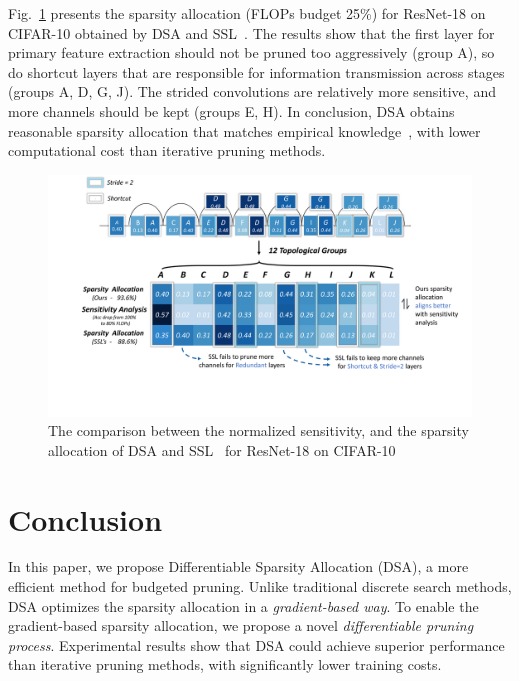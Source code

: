 \documentclass[runningheads]{llncs}
\newcommand{\dsa}{DSA\xspace}
\begin{document}
  
  
  Fig.~\ref{fig:heat} presents the sparsity allocation (FLOPs budget 25\%) for ResNet-18 on CIFAR-10 obtained by \dsa and SSL~\cite{grouplasso}.
  The results show that the first layer for primary feature extraction should not be pruned too aggressively (group A), 
  so do shortcut layers that are responsible for information transmission across stages (groups A, D, G, J). The strided convolutions are relatively more sensitive, 
  and more channels should be kept (groups E, H). 
  In conclusion, DSA obtains reasonable sparsity allocation that matches empirical knowledge~\cite{liu2019metapruning,rethinking}, with lower computational cost than iterative pruning methods.
  
    
  \begin{figure}[hb]
    \begin{center}
      \includegraphics[width=0.9\linewidth]{figs/heat.pdf}
      \caption{The comparison between the normalized sensitivity, and the sparsity allocation of \dsa and SSL~\cite{grouplasso} for ResNet-18 on CIFAR-10 }
      \label{fig:heat}
    \end{center}
  \end{figure}
  

  \section{Conclusion}
  \label{sec:conclusion}
  In this paper, we propose Differentiable Sparsity Allocation (DSA), a more efficient method for budgeted pruning. Unlike traditional discrete search methods, DSA optimizes the sparsity allocation in a \textit{gradient-based way}.  To enable the gradient-based sparsity allocation, we propose a novel \textit{differentiable pruning process}.
  Experimental results show that DSA could achieve superior performance than iterative pruning methods, with significantly lower training costs.
  
\end{document}
